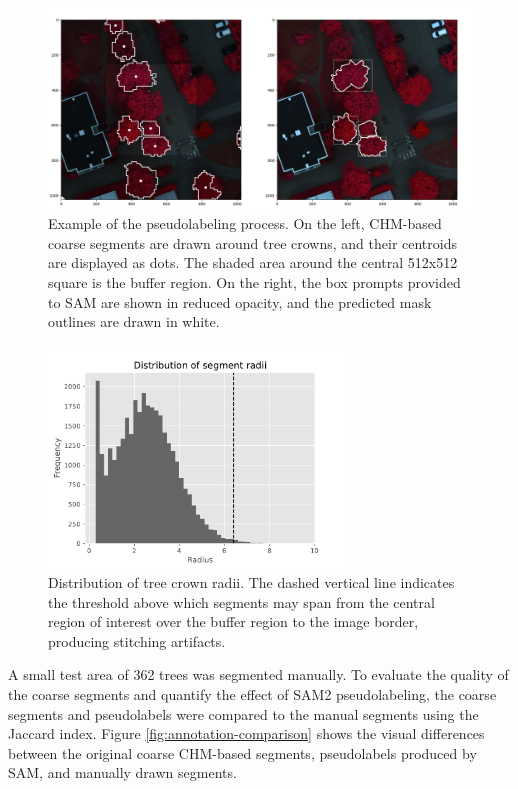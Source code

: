 \documentclass[english, 12pt, a4paper, sci, utf8, a-2b, online]{aaltothesis}
\begin{document}
\begin{figure}[h]
    \centering
    \includegraphics[width=1.0\textwidth]{figures/pseudolabel-example.png}
    \caption{Example of the pseudolabeling process. On the left, CHM-based coarse segments are drawn around tree crowns, and their centroids are displayed as dots. The shaded area around the central 512x512 square is the buffer region. On the right, the box prompts provided to SAM are shown in reduced opacity, and the predicted mask outlines are drawn in white.}
    \label{fig:pseudolabel}
\end{figure}

\begin{figure}[h]
    \centering
    \includegraphics[width=0.7\textwidth]{figures/radii.pdf}
    \caption{Distribution of tree crown radii. The dashed vertical line indicates the threshold above which segments may span from the central region of interest over the buffer region to the image border, producing stitching artifacts.}
    \label{fig:radii}
\end{figure}

A small test area of 362 trees was segmented manually. To evaluate the quality of the coarse segments and quantify the effect of SAM2 pseudolabeling, the coarse segments and pseudolabels were compared to the manual segments using the Jaccard index. Figure \ref{fig:annotation-comparison} shows the visual differences between the original coarse CHM-based segments, pseudolabels produced by SAM, and manually drawn segments.
\end{document}
